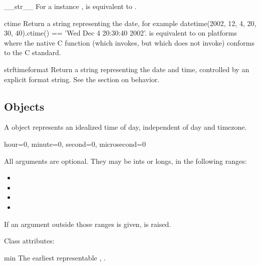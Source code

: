 \begin{methoddesc}{__str__}{}
    For a  instance ,  is
    equivalent to .
\end{methoddesc}

\begin{methoddesc}{ctime}{}
    Return a string representing the date, for example
    datetime(2002, 12, 4, 20, 30, 40).ctime() == 'Wed Dec  4 20:30:40 2002'.
     is equivalent to
     on platforms where
    the native C  function (which
     invokes, but which
     does not invoke) conforms to the C
    standard.
\end{methoddesc}

\begin{methoddesc}{strftime}{format}
    Return a string representing the date and time, controlled by an
    explicit format string.  See the section on 
    behavior.
\end{methoddesc}


\subsection{ Objects \label{datetime-time}}

A  object represents an idealized time of day, independent
of day and timezone.

\begin{funcdesc}{hour=0, minute=0, second=0, microsecond=0}

All arguments are optional.  They may be ints or longs, in the
following ranges:

\begin{itemize}
  \item {}
  \item {}
  \item {}
  \item {}
\end{itemize}

If an argument outside those ranges is given,  is
raised.
\end{funcdesc}

Class attributes:

\begin{memberdesc}{min}
        The earliest representable , .
\end{memberdesc}

